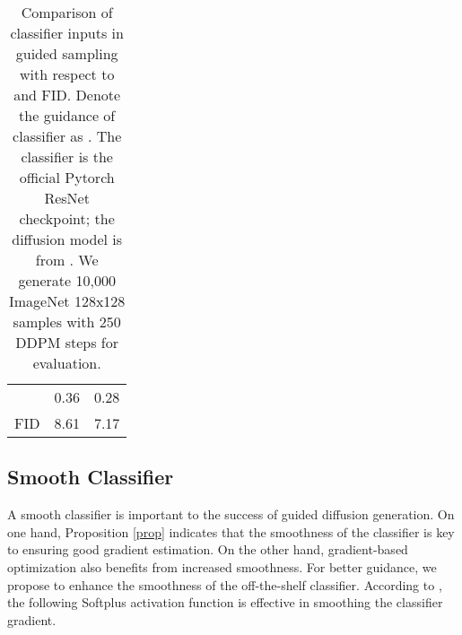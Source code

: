 \documentclass{article}
\theoremstyle{definition}
\begin{document}
\begin{table}[h!]
\caption{Comparison of classifier inputs in guided sampling with respect to  and FID. Denote the guidance of classifier  as . The classifier is the official Pytorch ResNet checkpoint; the diffusion model is from \cite{dhariwal2021diffusion}. We generate 10,000 ImageNet 128x128 samples with 250 DDPM steps for evaluation.}
\label{table:compare_xt_x0}
\begin{center}
\begin{small}
\begin{sc}
\begin{tabular}{lcc}
\toprule
     &  &  \\
\midrule     
          &  0.36 &  0.28\\
FID          &  8.61 &  7.17\\
\bottomrule
\end{tabular}
\end{sc}
\end{small}
\end{center}
\end{table}


\subsection{Smooth Classifier}
A smooth classifier is important to the success of guided diffusion generation. 
On one hand, Proposition \ref{prop} indicates that the smoothness of the classifier is key to ensuring good gradient estimation. 
On the other hand, gradient-based optimization also benefits from increased smoothness.
For better guidance, we propose to enhance the smoothness of the off-the-shelf classifier. 
According to \cite{zhu2021rethinking}, the following Softplus activation function \citep{nair2010rectified} is effective in smoothing the classifier gradient. 
\end{document}
